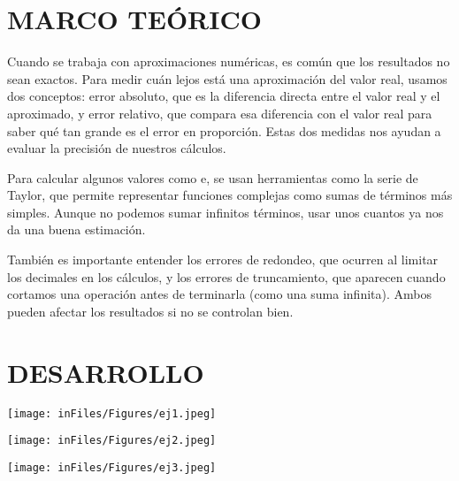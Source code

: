 \documentclass[12pt]{article}
\begin{document}
\vspace{0.5cm}

\section*{MARCO TEÓRICO}
{Cuando se trabaja con aproximaciones numéricas, es común que los resultados no sean exactos.
 Para medir cuán lejos está una aproximación del valor real, usamos dos conceptos: error absoluto,
  que es la diferencia directa entre el valor real y el aproximado, 
  y error relativo, que compara esa diferencia con el valor real para saber qué tan grande es el error en proporción. 
  Estas dos medidas nos ayudan a evaluar la precisión de nuestros cálculos.} \cite{fisicalabErrores}

  {Para calcular algunos valores como e, se usan herramientas como la serie de Taylor, que permite representar funciones 
  complejas como sumas de términos más simples. Aunque no podemos sumar infinitos términos, 
  usar unos cuantos ya nos da una buena estimación.} \cite{economipediaTaylor}

  {También es importante entender los errores de redondeo, que ocurren al limitar los decimales en los cálculos,
   y los errores de truncamiento, que aparecen cuando cortamos una operación antes de terminarla (como una suma infinita).
    Ambos pueden afectar los resultados si no se controlan bien. } \cite{uaRedondeo}
 

\vspace{0.5cm}

\section*{DESARROLLO}
\begin{minipage}{0.95\textwidth}
    \raggedleft
    \texttt{[image: inFiles/Figures/ej1.jpeg]}
\end{minipage}

\vspace{0.5cm}

\begin{minipage}{0.95\textwidth}
    \raggedleft
    \texttt{[image: inFiles/Figures/ej2.jpeg]}
\end{minipage}

\vspace{0.5cm}

\begin{minipage}{0.95\textwidth}
    \raggedleft
    \texttt{[image: inFiles/Figures/ej3.jpeg]}
\end{minipage}
\end{document}

